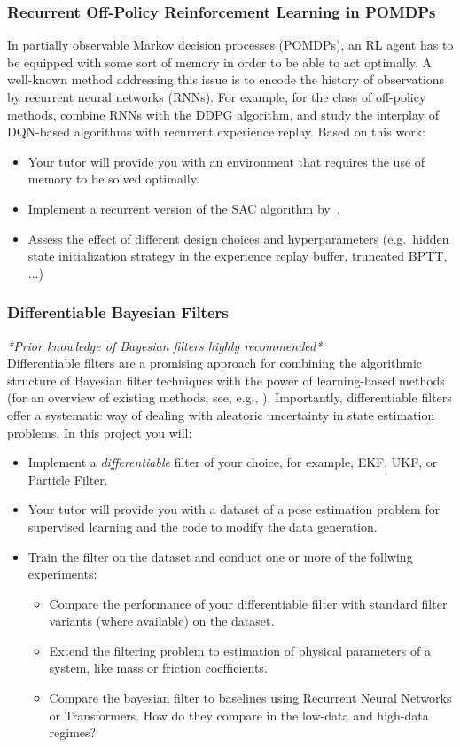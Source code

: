 \documentclass[a4paper]{article}
\begin{document}
\subsubsection{Recurrent Off-Policy Reinforcement Learning in POMDPs}
In partially observable Markov decision processes (POMDPs), an RL agent has to be equipped with some sort of memory in order to be able to act optimally.
A well-known method addressing this issue is to encode the history of observations by recurrent neural networks (RNNs).
For example, for the class of off-policy methods, \citet{heess2015} combine RNNs with the DDPG algorithm, and \citet{kapturowski2018} study the interplay of DQN-based algorithms with recurrent experience replay.
Based on this work:
\begin{itemize}
  \item Your tutor will provide you with an environment that requires the use of memory to be solved optimally.
  \item Implement a recurrent version of the SAC algorithm by~\citet{Haarnoja2018a}.
  \item Assess the effect of different design choices and hyperparameters (e.g.~hidden state initialization strategy in the experience replay buffer, truncated BPTT, ...)
\end{itemize}

\subsubsection{Differentiable Bayesian Filters}
\textit{*Prior knowledge of Bayesian filters highly recommended*}\\
Differentiable filters are a promising approach for combining the algorithmic structure of Bayesian filter techniques with the power of learning-based methods (for an overview of existing methods, see, e.g., \citet{kloss2021train}).
Importantly, differentiable filters offer a systematic way of dealing with aleatoric uncertainty in state estimation problems.
In this project you will:
\begin{itemize}
  \item Implement a \textit{differentiable} filter of your choice, for example, EKF, UKF, or Particle Filter.
  \item Your tutor will provide you with a dataset of a pose estimation problem for supervised learning and the code to modify the data generation.
  \item Train the filter on the dataset and conduct one or more of the follwing experiments:
  \begin{itemize}
    \item Compare the performance of your differentiable filter with standard filter variants (where available) on the dataset.
    \item Extend the filtering problem to estimation of physical parameters of a system, like mass or friction coefficients.
    \item Compare the bayesian filter to baselines using Recurrent Neural Networks or Transformers. How do they compare in the low-data and high-data regimes?
  \end{itemize}
\end{itemize}
\end{document}
